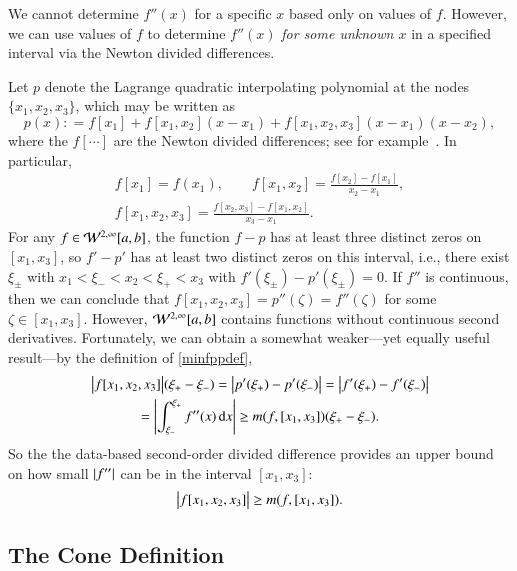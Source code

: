 \documentclass[review]{elsarticle}
\theoremstyle{definition}
\begin{document}
We cannot determine $f''(x)$ for a specific $x$ based only on values of $f$. However,
we can use values of $f$ to determine $f''(x)$ \emph{for some unknown $x$} in a
specified interval via the Newton divided differences.


Let $p$ denote the Lagrange quadratic interpolating polynomial at the nodes
$\{x_1, x_2, x_3\}$, which may be written as
\begin{equation*}
p(x) : = f[x_1] + f[x_1, x_2](x-x_1) + f[x_1, x_2, x_3](x-x_1)(x-x_2),
\end{equation*}
where the $f[\cdots]$ are the Newton divided differences; see for example~\cite{CheKin12a}. In particular,
\begin{gather}
\nonumber
f[x_1] = f(x_1), \qquad f[x_1, x_2] = \frac{f[x_2] - f[x_1]}{x_2-x_1},  \\
f[x_1, x_2,x_3] = \frac{f[x_2,x_3] - f[x_1,x_2]}{x_3-x_1}. \label{divdiff}
\end{gather}
For any $f \in
\mathcal{W}^{2,\infty}[a,b]$, the function $f - p$ has at least three distinct zeros on
$[x_1, x_3]$, so $f' - p'$ has at least two distinct zeros on this interval,
i.e., there exist $\xi_\pm$ with $x_1 < \xi_- < x_2 < \xi_+ < x_3$ with
$f'(\xi_\pm) - p'(\xi_{\pm}) = 0$. If $f''$ is continuous, then we can conclude
that $ f[x_1, x_2, x_3]= p''(\zeta) =f''(\zeta) $ for some $\zeta \in [x_1,
x_3]$. However, $\mathcal{W}^{2,\infty}[a,b]$ contains functions without continuous
second derivatives. Fortunately, we can obtain a somewhat weaker---yet equally useful result---by the definition of \eqref{minfppdef},
\begin{multline*}
\bigl \lvert f[x_1, x_2, x_3] \bigr \rvert(\xi_+  - \xi_-) = \left \lvert p'(\xi_+) - p'(\xi_-) \right \rvert =  \left \lvert f'(\xi_+) - f'(\xi_-) \right \rvert \\
= \left \lvert \int_{\xi_-}^{\xi_+} f''(x) \, {\rm d} x \right \rvert \ge m(f,[x_1, x_3]) (\xi_+  - \xi_-).
\end{multline*}
So the the data-based second-order divided difference provides an upper
bound on how small $\left \lvert f'' \right \rvert$ can be in the interval $[x_1, x_3]$:
\begin{equation}
\bigl \lvert f[x_1, x_2, x_3] \bigr \rvert \ge m(f,[x_1, x_3]).
\end{equation}

\subsection{The Cone Definition}  \label{sec:conedef}
\end{document}

